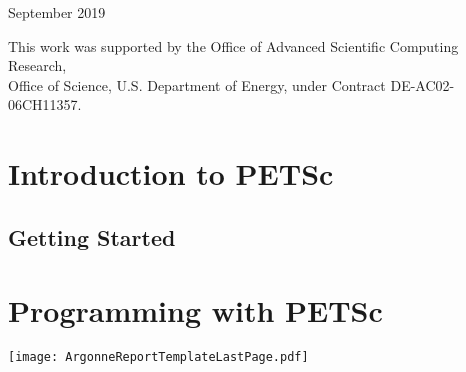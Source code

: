 \vspace*{30pt}
\noindent September 2019

\vspace*{20pt}
\noindent This work was supported by the Office of Advanced Scientific Computing Research, \\
Office of Science, U.S. Department of Energy, under Contract DE-AC02-06CH11357.


\cleardoublepage
\pagestyle{fancy}
\vspace{1in}
\date{\today}



\cleardoublepage



\medskip \medskip



\cleardoublepage
\label{tableofcontents}
\tableofcontents

\cleardoublepage
\part{Introduction to PETSc}
\label{part_intro}
\cleardoublepage
\chapter{Getting Started}


\cleardoublepage
\part{Programming with PETSc}
\label{part_usage}


\cleardoublepage




\cleardoublepage

\addtocounter{chapter}{1}
\label{sec:bib}


\pagestyle{empty}
\centerline{\texttt{[image: ArgonneReportTemplateLastPage.pdf]}}
\restoregeometry



